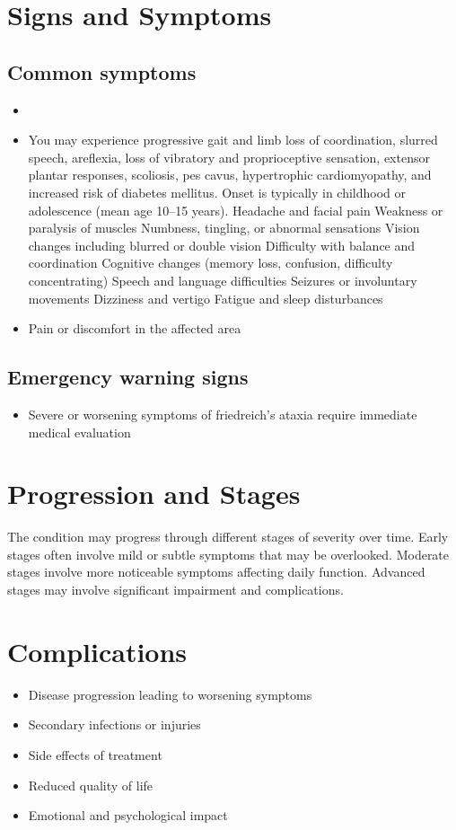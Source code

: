 \section{Signs and Symptoms}
\subsection{Common symptoms}
\begin{itemize}[noitemsep]
  \item \item You may experience progressive gait and limb loss of coordination, slurred speech, areflexia, loss of vibratory and proprioceptive sensation, extensor plantar responses, scoliosis, pes cavus, hypertrophic cardiomyopathy, and increased risk of diabetes mellitus. Onset is typically in childhood or adolescence (mean age 10--15 years). Headache and facial pain Weakness or paralysis of muscles Numbness, tingling, or abnormal sensations Vision changes including blurred or double vision Difficulty with balance and coordination Cognitive changes (memory loss, confusion, difficulty concentrating) Speech and language difficulties Seizures or involuntary movements Dizziness and vertigo Fatigue and sleep disturbances
  \item Pain or discomfort in the affected area
  \end{itemize}
\subsection{Emergency warning signs}
\begin{itemize}[noitemsep]
  \item Severe or worsening symptoms of friedreich's ataxia require immediate medical evaluation
\end{itemize}
\section{Progression and Stages}
The condition may progress through different stages of severity over time. Early stages often involve mild or subtle symptoms that may be overlooked. Moderate stages involve more noticeable symptoms affecting daily function. Advanced stages may involve significant impairment and complications.
\section{Complications}
\begin{itemize}[noitemsep]
  \item Disease progression leading to worsening symptoms
  \item Secondary infections or injuries
  \item Side effects of treatment
  \item Reduced quality of life
  \item Emotional and psychological impact
\end{itemize}
